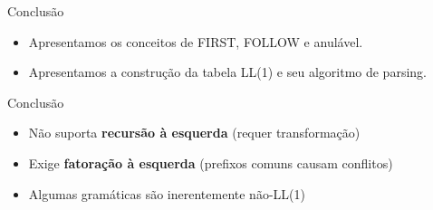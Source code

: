 \begin{frame}{Conclusão}

    \begin{itemize}
        \item
        Apresentamos os conceitos de FIRST, FOLLOW e anulável.
        \item
        Apresentamos a construção da tabela LL(1) e seu algoritmo de parsing.
    \end{itemize}
\end{frame}

\begin{frame}{Conclusão}

    \begin{itemize}

        \item
        Não suporta \textbf{recursão à esquerda} (requer transformação)
        \item
        Exige \textbf{fatoração à esquerda} (prefixos comuns causam conflitos)
        \item
        Algumas gramáticas são inerentemente não-LL(1)
    \end{itemize}
\end{frame}
